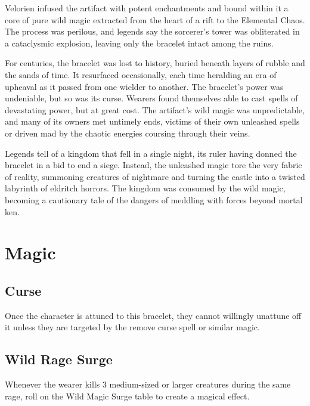 Velorien infused the artifact with potent enchantments and bound within it a core of pure wild magic extracted from the heart of a rift to the Elemental Chaos. The process was perilous, and legends say the sorcerer's tower was obliterated in a cataclysmic explosion, leaving only the bracelet intact among the ruins.

For centuries, the bracelet was lost to history, buried beneath layers of rubble and the sands of time. It resurfaced occasionally, each time heralding an era of upheaval as it passed from one wielder to another. The bracelet's power was undeniable, but so was its curse. Wearers found themselves able to cast spells of devastating power, but at great cost. The artifact's wild magic was unpredictable, and many of its owners met untimely ends, victims of their own unleashed spells or driven mad by the chaotic energies coursing through their veins.

Legends tell of a kingdom that fell in a single night, its ruler having donned the bracelet in a bid to end a siege. Instead, the unleashed magic tore the very fabric of reality, summoning creatures of nightmare and turning the castle into a twisted labyrinth of eldritch horrors. The kingdom was consumed by the wild magic, becoming a cautionary tale of the dangers of meddling with forces beyond mortal ken.

\section*{Magic}
\subsection*{Curse}
Once the character is attuned to this bracelet, they cannot willingly unattune off it unless they are targeted by the remove curse spell or similar magic.
\subsection*{Wild Rage Surge}
Whenever the wearer kills 3 medium-sized or larger creatures during the same rage, roll on the Wild Magic Surge table to create a magical effect.